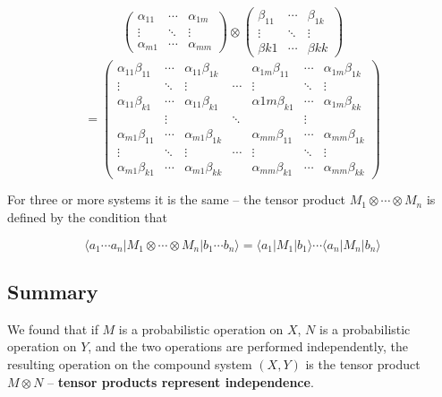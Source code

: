 \documentclass[svgnames]{article}     %
\begin{document}
\begin{align*}
  \begin{pmatrix}
  \alpha_{11} & \cdots & \alpha_{1m} \\ \vdots & \ddots & \vdots \\
    \alpha_{m1} & \cdots & \alpha_{mm}
  \end{pmatrix} \otimes \begin{pmatrix}
    \beta_{11} & \cdots & \beta_{1k} \\ \vdots & \ddots & \vdots \\ \beta{k1}
               & \cdots & \beta{kk}
  \end{pmatrix}  
\end{align*}
\[
= \begin{pmatrix}
  \alpha_{11}\beta_{11} & \cdots & \alpha_{11}\beta_{1k} & & \alpha_{1m}\beta_{11} & \cdots & \alpha_{1m}\beta_{1k} \\ \vdots & \ddots & \vdots & \cdots & \vdots & \ddots & \vdots \\ \alpha_{11}\beta_{k1} & \cdots & \alpha_{11}\beta_{k1} & & \alpha{1m}\beta_{k1} &\cdots & \alpha_{1m}\beta_{kk} \\ & \vdots & & \ddots & & \vdots & \\ \alpha_{m1}\beta_{11} &\cdots &\alpha_{m1}\beta_{1k} & & \alpha_{mm}\beta_{11}& \cdots & \alpha_{mm}\beta_{1k} \\ \vdots & \ddots & \vdots & \cdots & \vdots & \ddots & \vdots \\ \alpha_{m1}\beta_{k1} & \cdots & \alpha_{m1} \beta_{kk} & & \alpha_{mm} \beta_{k1} & \cdots & \alpha_{mm}\beta_{kk}
\end{pmatrix} 
\] \vspace{5px}

For three or more systems it is the same -- the tensor product $M_1 \otimes \cdots \otimes M_n$ is defined by the condition that 

\[
  \langle a_1\cdots a_n | M_1\otimes \cdots\otimes M_n |b_1 \cdots b_n\rangle = \langle a_1 | M_1|b_1\rangle \cdots \langle a_n | M_n |b_n\rangle 
\] \vspace{5px}


\subsection{Summary} 

We found that if $M$ is a probabilistic operation on $X$, $N$ is a probabilistic operation on $Y$, and the two operations are performed independently, the resulting operation on the compound system $(X, Y)$ is the tensor product $M \otimes N$ -- \textbf{tensor products represent independence}. \\
\end{document}
